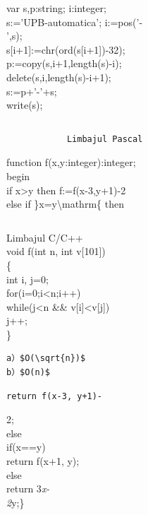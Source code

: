 \documentclass[10pt]{article}
\begin{document}
var s,p:string; i:integer;\\
s:='UPB-automatica'; i:=pos('-\\
',s);\\[0pt]
s[i+1]:=chr(ord(s[i+1])-32);\\
p:=copy(s,i+1,length(s)-i);\\
delete(s,i,length(s)-i+1);\\
s:=p+'-'+s;\\
write(s);

\begin{verbatim}

\end{verbatim}

\begin{verbatim}
            Limbajul Pascal
\end{verbatim}

function f(x,y:integer):integer;\\
begin\\
if x>y then f:=f(x-3,y+1)-2\\
else if \}x=y\textbackslash mathrm\{ then

\begin{verbatim}

\end{verbatim}

Limbajul C/C++\\[0pt]
void f(int n, int v[101])\\
\{\\
int i, j=0;\\
for(i=0;i<n;i++)\\[0pt]
while(j<n \&\& v[i]<v[j])\\
j++;\\
\}

\begin{verbatim}
a）$O(\sqrt{n})$
b）$O(n)$
\end{verbatim}

\begin{verbatim}
return f(x-3, y+1)-
\end{verbatim}

2;\\
else\\
if(x==y)\\
return f(x+1, y);\\
else\\
return 3\textit{x-\\
2}y;\}

\begin{verbatim}

\end{verbatim}
\end{document}
